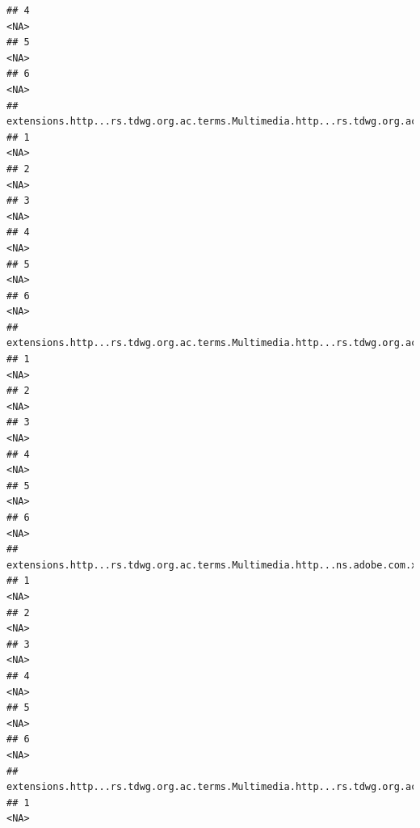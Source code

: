 \documentclass[
]{book}
\begin{document}
\begin{verbatim}
## 4                                                                                     <NA>
## 5                                                                                     <NA>
## 6                                                                                     <NA>
##   extensions.http...rs.tdwg.org.ac.terms.Multimedia.http...rs.tdwg.org.ac.terms.subjectPart.1
## 1                                                                                        <NA>
## 2                                                                                        <NA>
## 3                                                                                        <NA>
## 4                                                                                        <NA>
## 5                                                                                        <NA>
## 6                                                                                        <NA>
##   extensions.http...rs.tdwg.org.ac.terms.Multimedia.http...rs.tdwg.org.ac.terms.associatedObservationReference.1
## 1                                                                                                           <NA>
## 2                                                                                                           <NA>
## 3                                                                                                           <NA>
## 4                                                                                                           <NA>
## 5                                                                                                           <NA>
## 6                                                                                                           <NA>
##   extensions.http...rs.tdwg.org.ac.terms.Multimedia.http...ns.adobe.com.xap.1.0.rights.UsageTerms.1
## 1                                                                                              <NA>
## 2                                                                                              <NA>
## 3                                                                                              <NA>
## 4                                                                                              <NA>
## 5                                                                                              <NA>
## 6                                                                                              <NA>
##   extensions.http...rs.tdwg.org.ac.terms.Multimedia.http...rs.tdwg.org.ac.terms.taxonCount.1
## 1                                                                                       <NA>

\end{verbatim}
\end{document}
